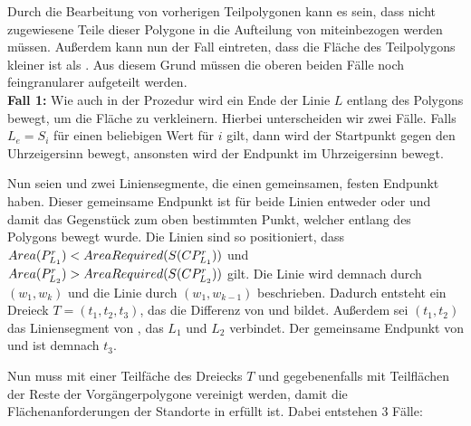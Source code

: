 \documentclass[ngerman]{seminarbeitrag}
\begin{document}
Durch die Bearbeitung von vorherigen Teilpolygonen kann es sein, dass nicht zugewiesene Teile dieser Polygone in die Aufteilung von \cpi miteinbezogen werden müssen. Außerdem kann nun der Fall eintreten, dass die Fläche des Teilpolygons kleiner ist als . Aus diesem Grund müssen die oberen beiden Fälle noch feingranularer aufgeteilt werden.\\

\textbf{Fall 1:} Wie auch in der Prozedur \con wird ein Ende der Linie $L$ entlang des Polygons bewegt, um die Fläche \ar{\mprl} zu verkleinern. Hierbei unterscheiden wir zwei Fälle. Falls $L_{e} = S_{i}$ für einen beliebigen Wert für $i$ gilt, dann wird der Startpunkt \ls gegen den Uhrzeigersinn bewegt, ansonsten wird der Endpunkt \Le im Uhrzeigersinn bewegt.

Nun seien \leins und \lzwei zwei Liniensegmente, die einen gemeinsamen, festen Endpunkt haben. Dieser gemeinsame Endpunkt ist für beide Linien entweder \ls oder \Le und damit das Gegenstück zum oben bestimmten Punkt, welcher entlang des Polygons bewegt wurde. Die Linien sind so positioniert, dass $Area(P^{r}_{L_{1}}) < AreaRequired(S(CP^{r}_{L_{1}}))$ und $Area(P^{r}_{L_{2}}) > AreaRequired(S(CP^{r}_{L_{2}}))$ gilt. Die Linie \lzwei wird demnach durch $(w_{1}, w_{k})$ und die Linie \leins durch $(w_{1}, w_{k-1})$ beschrieben.
Dadurch entsteht ein Dreieck $T = (t_{1}, t_{2}, t_{3})$, das die Differenz von \cprleins und \cprlzwei bildet. Außerdem sei $(t_{1}, t_{2})$ das Liniensegment von \cpi, das $L_{1}$ und $L_{2}$ verbindet. Der gemeinsame Endpunkt von \leins und \lzwei ist demnach $t_{3}$.

Nun muss \cprleins mit einer Teilfäche des Dreiecks $T$ und gegebenenfalls mit Teilflächen der Reste der Vorgängerpolygone vereinigt werden, damit die Flächenanforderungen der Standorte in \cprleins erfüllt ist. Dabei entstehen 3 Fälle:
\end{document}
